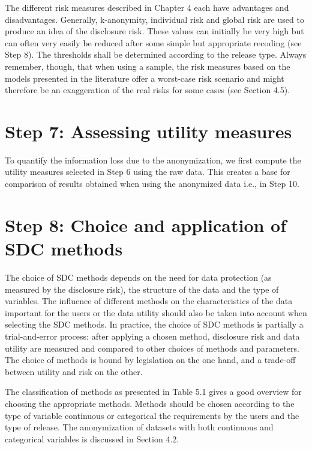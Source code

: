 \documentclass[letterpaper,10pt,english]{sphinxmanual}
\begin{document}
The different risk measures described in Chapter 4 each have advantages
and disadvantages. Generally,\(\text{\ k}\)-anonymity, individual
risk and global risk are used to produce an idea of the disclosure risk.
These values can initially be very high but can often very easily be
reduced after some simple but appropriate recoding (see Step 8). The
thresholds shall be determined according to the release type. Always
remember, though, that when using a sample, the risk measures based on
the models presented in the literature offer a worst-case risk scenario
and might therefore be an exaggeration of the real risks for some cases
(see Section 4.5).


\section{Step 7: Assessing utility measures}
\label{\detokenize{process:step-7-assessing-utility-measures}}
To quantify the information loss due to the anonymization, we first
compute the utility measures selected in Step 6 using the raw data. This
creates a base for comparison of results obtained when using the
anonymized data \textendash{} i.e., in Step 10. 


\section{Step 8: Choice and application of SDC methods}
\label{\detokenize{process:step-8-choice-and-application-of-sdc-methods}}
The choice of SDC methods depends on the need for data protection (as
measured by the disclosure risk), the structure of the data and the type
of variables. The influence of different methods on the characteristics
of the data important for the users or the data utility should also be
taken into account when selecting the SDC methods. In practice, the
choice of SDC methods is partially a trial-and-error process: after
applying a chosen method, disclosure risk and data utility are measured
and compared to other choices of methods and parameters. The choice of
methods is bound by legislation on the one hand, and a trade-off between
utility and risk on the other.

The classification of methods as presented in Table 5.1 gives a good
overview for choosing the appropriate methods. Methods should be chosen
according to the type of variable \textendash{} continuous or categorical \textendash{} the
requirements by the users and the type of release. The anonymization of
datasets with both continuous and categorical variables is discussed in
Section 4.2.
\end{document}
